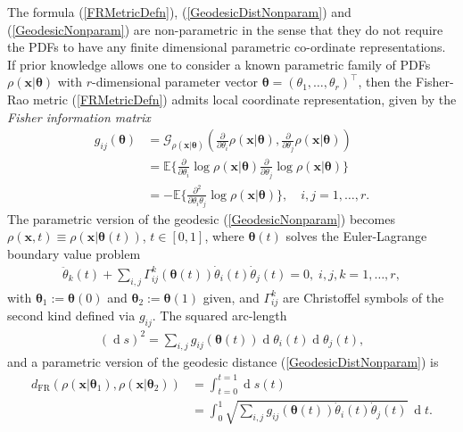 \documentclass[letterpaper,10pt,twocolumn,conference]{ieeeconf}
\newcommand{\cG}{{\mathcal G}}
\newcommand{\bbx}{{\bm{x}}}
\newcommand{\btheta}{\bm{\theta}}
\newcommand{\dFR}{d_{\mathrm{FR}}}
\newcommand{\differential}{\operatorname{d}}
\begin{document}
The formula (\ref{FRMetricDefn}), (\ref{GeodesicDistNonparam}) and (\ref{GeodesicNonparam}) are non-parametric in the sense that they do not require the PDFs to have any finite dimensional parametric co-ordinate representations. %
If prior knowledge allows one to consider a known parametric family of PDFs $\rho(\bbx|\btheta)$ with $r$-dimensional parameter vector $\btheta = (\theta_{1},\hdots,\theta_{r})^{\top}$, then the Fisher-Rao metric (\ref{FRMetricDefn}) admits local coordinate representation, given by the \emph{Fisher information matrix} \cite{fisher1925theory}
\begin{align}
	g_{ij}(\btheta) &= \cG_{\rho(\bbx|\btheta)}\left(\frac{\partial}{\partial\theta_{i}}\rho(\bbx|\btheta),\frac{\partial}{\partial\theta_{j}}\rho(\bbx|\btheta)\right)\\
	&= \mathbb{E}\bigg\{\frac{\partial}{\partial\theta_{i}}\log\rho(\bbx|\btheta)\frac{\partial}{\partial\theta_{j}}\log\rho(\bbx|\btheta)\bigg\} \\
	&= -\mathbb{E}\bigg\{\frac{\partial^{2}}{\partial\theta_{i}\theta_{j}}\log\rho(\bbx|\btheta)\bigg\}, \quad i,j=1,\hdots,r.
\end{align}
The parametric version of the geodesic (\ref{GeodesicNonparam}) becomes $\rho\left(\bbx, t\right) \equiv \rho\left(\bbx | \btheta(t)\right)$, $t\in[0,1]$, where $\btheta(t)$ solves the Euler-Lagrange boundary value problem	
\begin{align}
\!\!\!\ddot{\theta}_{k}(t) \!+ \!\!\displaystyle\sum_{i,j}\Gamma_{ij}^{k}(\btheta(t))\dot{\theta}_{i}(t)\dot{\theta}_{j}(t) = 0, \; i,j,k=1,\hdots,r,
\label{EulerLagrangeParametric}
\end{align}
with $\btheta_{1}:=\btheta(0)$ and $\btheta_{2}:=\btheta(1)$ given, and $\Gamma_{ij}^{k}$ are Christoffel symbols of the second kind defined via $g_{ij}$. The squared arc-length 
\begin{eqnarray}
(\differential s)^{2} = \sum_{i,j}g_{ij}(\btheta(t))\differential\theta_{i}(t)\differential\theta_{j}(t),	
\label{dsSquareParametric}
\end{eqnarray}
and a parametric version of the geodesic distance (\ref{GeodesicDistNonparam}) is 
{\small{\begin{align}
	\dFR\left(\rho(\bbx|\btheta_{1}),\rho(\bbx|\btheta_{2})\right) &= \!\int_{t=0}^{t=1}\!\!\!\differential s(t) \nonumber\\
	&= \!\displaystyle\int_{0}^{1}\!\!\!\sqrt{\sum_{i,j}g_{ij}(\btheta(t))\dot{\theta}_{i}(t)\dot{\theta}_{j}(t)}\:\differential t. 
\end{align}}}
\end{document}
